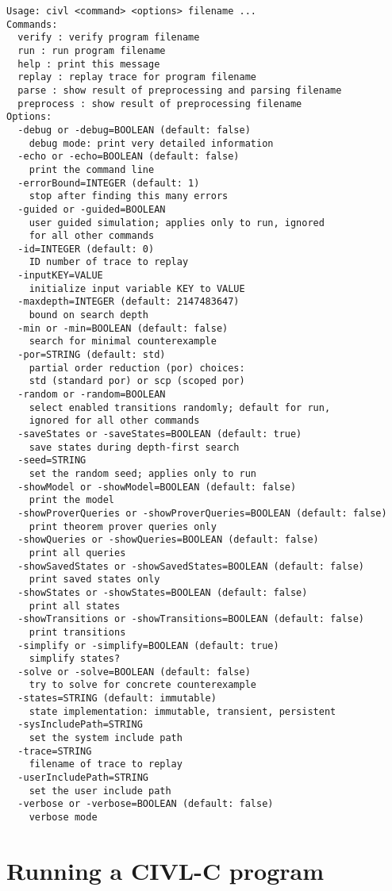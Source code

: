 \begin{verbatim}
Usage: civl <command> <options> filename ...
Commands:
  verify : verify program filename
  run : run program filename
  help : print this message
  replay : replay trace for program filename
  parse : show result of preprocessing and parsing filename
  preprocess : show result of preprocessing filename
Options:
  -debug or -debug=BOOLEAN (default: false)
    debug mode: print very detailed information
  -echo or -echo=BOOLEAN (default: false)
    print the command line
  -errorBound=INTEGER (default: 1)
    stop after finding this many errors
  -guided or -guided=BOOLEAN
    user guided simulation; applies only to run, ignored
    for all other commands
  -id=INTEGER (default: 0)
    ID number of trace to replay
  -inputKEY=VALUE
    initialize input variable KEY to VALUE
  -maxdepth=INTEGER (default: 2147483647)
    bound on search depth
  -min or -min=BOOLEAN (default: false)
    search for minimal counterexample
  -por=STRING (default: std)
    partial order reduction (por) choices:
    std (standard por) or scp (scoped por)
  -random or -random=BOOLEAN
    select enabled transitions randomly; default for run,
    ignored for all other commands
  -saveStates or -saveStates=BOOLEAN (default: true)
    save states during depth-first search
  -seed=STRING
    set the random seed; applies only to run
  -showModel or -showModel=BOOLEAN (default: false)
    print the model
  -showProverQueries or -showProverQueries=BOOLEAN (default: false)
    print theorem prover queries only
  -showQueries or -showQueries=BOOLEAN (default: false)
    print all queries
  -showSavedStates or -showSavedStates=BOOLEAN (default: false)
    print saved states only
  -showStates or -showStates=BOOLEAN (default: false)
    print all states
  -showTransitions or -showTransitions=BOOLEAN (default: false)
    print transitions
  -simplify or -simplify=BOOLEAN (default: true)
    simplify states?
  -solve or -solve=BOOLEAN (default: false)
    try to solve for concrete counterexample
  -states=STRING (default: immutable)
    state implementation: immutable, transient, persistent
  -sysIncludePath=STRING
    set the system include path
  -trace=STRING
    filename of trace to replay
  -userIncludePath=STRING
    set the user include path
  -verbose or -verbose=BOOLEAN (default: false)
    verbose mode
\end{verbatim}

\chapter{Running a CIVL-C program}

